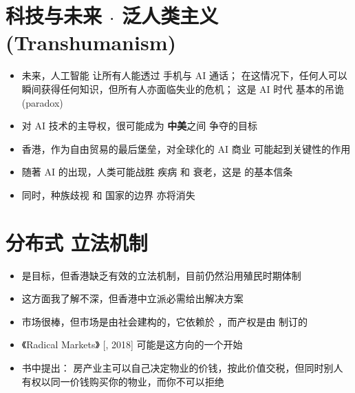 \section{科技与未来 $\cdot$ 泛人类主义 (Transhumanism)}
\begin{itemize}
	\item 未来，人工智能 让所有人能透过 手机与 AI 通话； 在这情况下，任何人可以瞬间获得任何知识，但所有人亦面临失业的危机； 这是 AI 时代 基本的吊诡 (paradox)
	
	\item 对 AI 技术的主导权，很可能成为 \textbf{中美}之间 争夺的目标
	
	\item 香港，作为自由贸易的最后堡垒，对全球化的 AI 商业 可能起到关键性的作用
	
	\item 随著 AI 的出现，人类可能战胜 疾病 和 衰老，这是  的基本信条
	
	\item 同时，种族歧视 和 国家的边界 亦将消失
\end{itemize}




\section{分布式 立法机制}
\begin{itemize}
	\item {} 是目标，但香港缺乏有效的立法机制，目前仍然沿用殖民时期体制
	
	\item 这方面我了解不深，但香港中立派必需给出解决方案
	
	\item 市场很棒，但市场是由社会建构的，它依赖於 ，而产权是由  制订的

	\item 《Radical Markets》 [, 2018] 可能是这方向的一个开始
	
	\item 书中提出： 房产业主可以自己决定物业的价钱，按此价值交税，但同时别人有权以同一价钱购买你的物业，而你不可以拒绝
	
\end{itemize}


